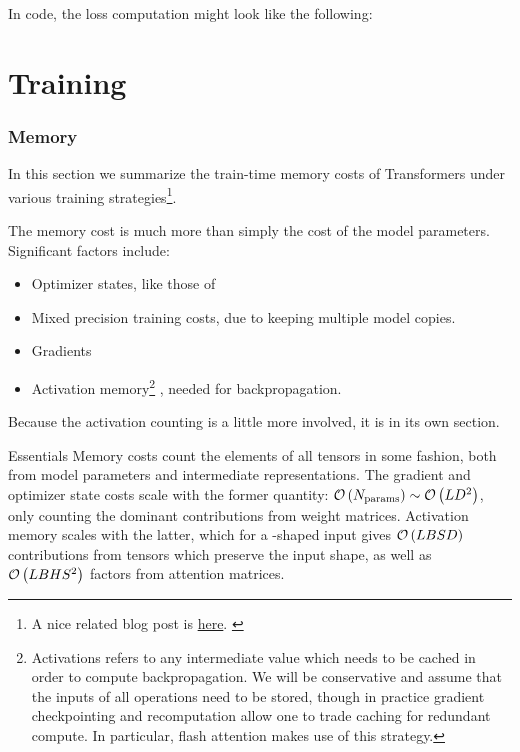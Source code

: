\documentclass[11pt]{article}
\begin{document}
In 
code, the loss computation might look like the following:

\part{Training}

\section{Memory \label{sec_memory_training}}

In this section we summarize the train-time memory costs of Transformers under various training
strategies\footnote{A nice related blog post is \href{https://blog.eleuther.ai/transformer-math/}{here}. \label{foot_eleuther_math_101} }.

The memory cost is much more than simply the cost of the model
parameters. Significant factors include:
\begin{itemize}
\item Optimizer states, like those of 
\item Mixed precision training costs, due to keeping multiple model copies.
\item Gradients
\item Activation memory\footnote{Activations refers to any intermediate value which needs to be
    cached in order to compute backpropagation. We will be conservative and assume that the inputs
of all operations need to be stored, though in practice gradient checkpointing and recomputation
allow one to trade caching for redundant compute. In particular, flash attention
\cite{dao2022flashattention} makes use of this strategy.} , needed for backpropagation.
\end{itemize}
Because the activation counting is a little more involved, it is in its own section.


\begin{nicebox}{Essentials}
Memory costs count the elements of all tensors in some fashion, both from model parameters and
intermediate representations. The gradient and optimizer state costs scale with the former quantity:
$ \mathcal{O} \left ( N _{ {\rm params}  } \right ) \sim \mathcal{O} \left ( L D ^{ 2 } \right )$, only counting
the dominant contributions from weight matrices. Activation memory scales with the latter,
which for a -shaped input gives $ \mathcal{O} \left ( LBSD  \right ) $ contributions
from tensors which preserve the input shape, as well as $ \mathcal{O} \left( LBHS ^{ 2 } \right)  $
factors from attention matrices.
\end{nicebox}
\end{document}
